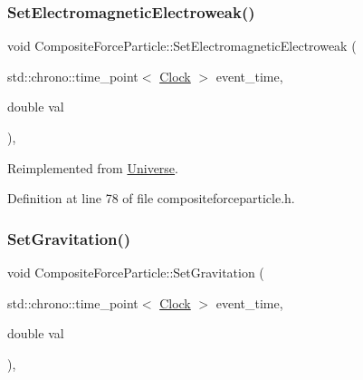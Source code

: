 \mbox{\label{class_composite_force_particle_ad53c5d396b3c56241174a9bd78f9e07a}} 
\subsubsection{\texorpdfstring{Set\+Electromagnetic\+Electroweak()}{SetElectromagneticElectroweak()}}
{\footnotesize\ttfamily void Composite\+Force\+Particle\+::\+Set\+Electromagnetic\+Electroweak (\begin{DoxyParamCaption}\item[{std\+::chrono\+::time\+\_\+point$<$ \hyperlink{universe_8h_a0ef8d951d1ca5ab3cfaf7ab4c7a6fd80}{Clock} $>$}]{event\+\_\+time,  }\item[{double}]{val }\end{DoxyParamCaption})\hspace{0.3cm}{\ttfamily [inline]}, {\ttfamily [virtual]}}



Reimplemented from \hyperlink{class_universe_a608aa95698380f791a0ffba45cc1bee3}{Universe}.



Definition at line 78 of file compositeforceparticle.\+h.

\mbox{\label{class_composite_force_particle_ad9e1553ab0096230edd591e3135b223d}} 
\subsubsection{\texorpdfstring{Set\+Gravitation()}{SetGravitation()}}
{\footnotesize\ttfamily void Composite\+Force\+Particle\+::\+Set\+Gravitation (\begin{DoxyParamCaption}\item[{std\+::chrono\+::time\+\_\+point$<$ \hyperlink{universe_8h_a0ef8d951d1ca5ab3cfaf7ab4c7a6fd80}{Clock} $>$}]{event\+\_\+time,  }\item[{double}]{val }\end{DoxyParamCaption})\hspace{0.3cm}{\ttfamily [inline]}, {\ttfamily [virtual]}}



